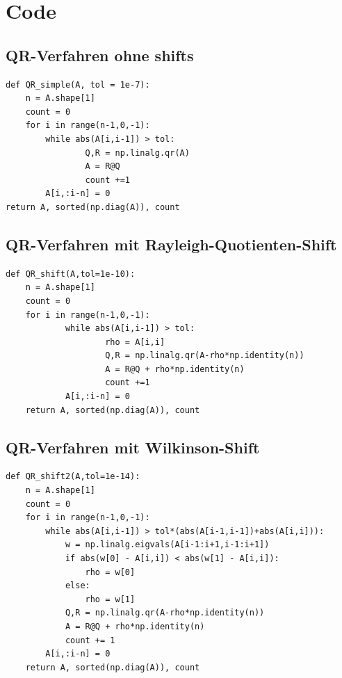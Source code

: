 \documentclass{article}
\theoremstyle{plain}
\begin{document}
\newpage
\pagestyle{plain}
\section*{Code}

\subsection*{QR-Verfahren ohne shifts}

\begin{lstlisting}
def QR_simple(A, tol = 1e-7):
	n = A.shape[1]
	count = 0
	for i in range(n-1,0,-1):
		while abs(A[i,i-1]) > tol:
				Q,R = np.linalg.qr(A)
				A = R@Q
				count +=1
		A[i,:i-n] = 0
return A, sorted(np.diag(A)), count
\end{lstlisting}



\subsection*{QR-Verfahren mit Rayleigh-Quotienten-Shift}
\begin{lstlisting}
def QR_shift(A,tol=1e-10):
	n = A.shape[1]
	count = 0
	for i in range(n-1,0,-1):
			while abs(A[i,i-1]) > tol:
					rho = A[i,i]
					Q,R = np.linalg.qr(A-rho*np.identity(n))
					A = R@Q + rho*np.identity(n)
					count +=1
			A[i,:i-n] = 0
	return A, sorted(np.diag(A)), count
\end{lstlisting}


\subsection*{QR-Verfahren mit Wilkinson-Shift}


\begin{lstlisting}
def QR_shift2(A,tol=1e-14):
    n = A.shape[1]
    count = 0
    for i in range(n-1,0,-1):
        while abs(A[i,i-1]) > tol*(abs(A[i-1,i-1])+abs(A[i,i])):
            w = np.linalg.eigvals(A[i-1:i+1,i-1:i+1])
            if abs(w[0] - A[i,i]) < abs(w[1] - A[i,i]):
                rho = w[0]
            else:
                rho = w[1]
            Q,R = np.linalg.qr(A-rho*np.identity(n))
            A = R@Q + rho*np.identity(n)
            count += 1
        A[i,:i-n] = 0
    return A, sorted(np.diag(A)), count
\end{lstlisting}
\end{document}
